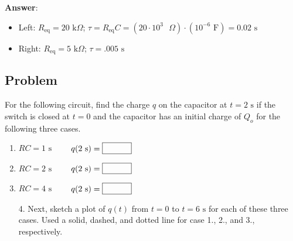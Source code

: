 \documentclass{article}
\begin{document}


\ifsolutions
\textbf{Answer}:

    \begin{itemize}

      \item Left: $R_{\text{eq}}=20\text{ k}\Omega$; $\tau = R_{\text{eq}}C = (20\cdot 10^3\text{ }\Omega) \cdot (10^{-6}\text{ F}) = 0.02\text{ s}$

      \item Right: $R_{\text{eq}}=5\text{ k}\Omega$; $\tau=.005\text{ s}$

    \end{itemize}
\else
\vskip 72pt
\fi
\ifsolutions\else
\vskip 72pt
\fi

\newpage

\subsection{Problem}

For the following circuit, find the charge $q$ on the capacitor at $t=2\text{ s}$ if the switch is closed at $t=0$ and the capacitor has an initial charge of $Q_o$ for the following three cases.

\begin{enumerate}

  \item $RC=1\text{ s}\qquad$ $q(2\text{ s})=\fbox{\qquad\phantom M}$

  \item $RC=2\text{ s}\qquad$ $q(2\text{ s})=\fbox{\qquad\phantom M}$

  \item $RC=4\text{ s}\qquad$ $q(2\text{ s})=\fbox{\qquad\phantom M}$

\end{enumerate}

\ifsolutions

\else
\vskip 56.25pt
\fi
\ifsolutions\else
\vskip 56.25pt
\fi

\begin{enumerate}

  \item[4.] Next, sketch a plot of $q(t)$ from $t=0$ to $t=6\text{ s}$ for each of these three cases. Used a solid, dashed, and dotted line for case 1., 2., and 3., respectively.

\end{enumerate}


\end{document}
